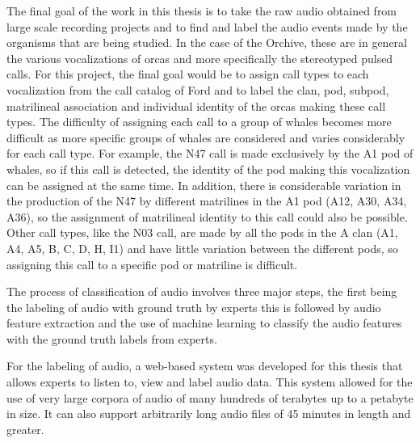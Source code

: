 \documentclass[12pt,oneside]{book}
\begin{document}

\label{chap:evaluation}

The final goal of the work in this thesis is to take the raw audio
obtained from large scale recording projects and to find and label the
audio events made by the organisms that are being studied.  In the
case of the Orchive, these are in general the various vocalizations of
orcas and more specifically the stereotyped pulsed calls.  For this
project, the final goal would be to assign call types to each
vocalization from the call catalog of Ford \cite{ford1987catalogue}
and to label the clan, pod, subpod, matrilineal association and
individual identity of the orcas making these call types.  The difficulty of
assigning each call to a group of whales becomes more difficult as
more specific groups of whales are considered and varies considerably
for each call type.  For example, the N47 call is made exclusively by
the A1 pod of whales, so if this call is detected, the identity of the
pod making this vocalization can be assigned at the same time.  In
addition, there is considerable variation in the production of the N47
by different matrilines in the A1 pod (A12, A30, A34, A36), so the
assignment of matrilineal identity to this call could also be possible.
Other call types, like the N03 call, are made by all the pods in the A clan
(A1, A4, A5, B, C, D, H, I1) and have little variation between the
different pods, so assigning this call to a specific pod or matriline
is difficult.

The process of classification of audio involves three major steps, the
first being the labeling of audio with ground truth by experts this is
followed by audio feature extraction and the use of machine learning
to classify the audio features with the ground truth labels from
experts.

For the labeling of audio, a web-based system was developed for this
thesis that allows experts to listen to, view and label audio data.
This system allowed for the use of very large corpora of audio of many
hundreds of terabytes up to a petabyte in size.  It can also support
arbitrarily long audio files of 45 minutes in length and greater.
\end{document}

